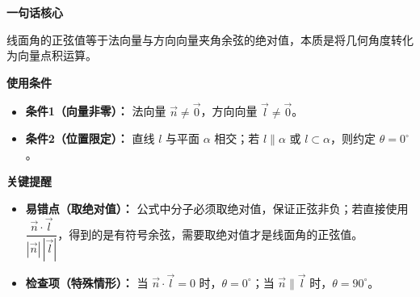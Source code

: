 \begin{summarybox}

	\textbf{\textcolor{CSummary}{一句话核心}}

	线面角的正弦值等于法向量与方向向量夹角余弦的绝对值，本质是将几何角度转化为向量点积运算。

	\medskip

	\textbf{\textcolor{CSummary}{使用条件}}

	\begin{itemize}[leftmargin=*, itemsep=0.5em, topsep=0.4em]
		\item \textbf{条件1（向量非零）：} 法向量 $\vec{n}\neq\vec{0}$，方向向量 $\vec{l}\neq\vec{0}$。
		\item \textbf{条件2（位置限定）：} 直线 $l$ 与平面 $\alpha$ 相交；若 $l\parallel\alpha$ 或 $l\subset\alpha$，则约定 $\theta=0^\circ$。
	\end{itemize}

	\medskip

	\textbf{\textcolor{CSummary}{关键提醒}}

	\begin{itemize}[leftmargin=*, itemsep=0.5em, topsep=0.4em]
		\item \textbf{易错点（取绝对值）：} 公式中分子必须取绝对值，保证正弦非负；若直接使用 $\dfrac{\vec{n}\cdot\vec{l}}{|\vec{n}|\,|\vec{l}|}$，得到的是有符号余弦，需要取绝对值才是线面角的正弦值。
		\item \textbf{检查项（特殊情形）：} 当 $\vec{n}\cdot\vec{l}=0$ 时，$\theta=0^\circ$；当 $\vec{n}\parallel\vec{l}$ 时，$\theta=90^\circ$。
	\end{itemize}

\end{summarybox}